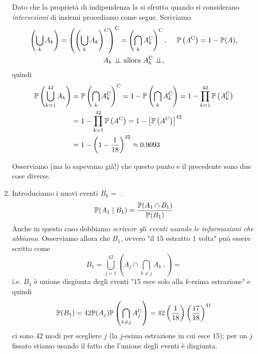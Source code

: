 \begin{enumerate}
	Dato che la proprietà di indipendenza la si sfrutta quando si considerano \textit{intersezioni} di insiemi procediamo come segue. Scriviamo
	\begin{gather*}
		\left(\bigcup_{k} A_{k}\right) =\left(\left(\bigcup_{k} A_{k}\right)^{\mathrm{C}}\right)^{\mathrm{C}} =\left(\bigcap_{k} A_{k}^{\mathrm{C}}\right)^{\mathrm{C}} ,\ \ \ \ \mathbb{P}\left(A^{\mathrm{C}}\right) =1-\mathbb{P}(A) ,\\
		A_{k} \perp \!\!\! \perp \text{allora} \ A_{k}^{\mathrm{C}} \perp \!\!\! \perp ,
	\end{gather*}
	quindi
	\begin{align*}
		\mathbb{P}\left(\bigcup_{k=1}^{42} A_{k}\right) & =\mathbb{P}\left(\bigcap_{k} A_{k}^{\mathrm{C}}\right)^{\mathrm{C}} =1-\mathbb{P}\left(\bigcap_{k} A_{k}^{\mathrm{C}}\right) =1-\prod_{k=1}^{42}\mathbb{P}\left(A_{k}^{\mathrm{C}}\right)\\
		 & =1-\prod_{k=1}^{42}\mathbb{P}\left(A^{\mathrm{C}}\right) =1-\left[\mathbb{P}\left(A^{\mathrm{C}}\right)\right]^{42}\\
		 & =1-\left(1-\frac{1}{18}\right)^{42} \approx 0.9093
	\end{align*}

	\begin{oss}
		Osserviamo (ma lo sapevamo già!) che questo punto e il precedente sono due cose diverse.
	\end{oss}
	\item Introduciamo i nuovi eventi $B_{k} =$ .
	\begin{equation*}
		\mathbb{P}(A_{1} \mid B_{1}) =\frac{\mathbb{P}(A_{1} \cap B_{1})}{\mathbb{P}(B_{1})}
	\end{equation*}
	Anche in questo caso dobbiamo \textit{scrivere gli eventi usando le informazioni che abbiamo}. Osserviamo allora che $B_{1}$, ovvero "il $15$ estratto $1$ volta" può essere scritto come
	\begin{equation*}
		B_{1} =\bigcup_{j=1}^{42}\left(A_{j} \cap \bigcap_{k\neq j} A_{k}\comp\right) =
	\end{equation*}
	i.e. $B_{1}$ è unione disgiunta degli eventi "$15$ esce solo alla $k$-esima estrazione" e quindi
	\begin{equation*}
		\mathbb{P}(B_{1}) =42\mathbb{P}(A_{j})\mathbb{P}\left(\bigcap_{k\neq j} A_{j}^{\mathrm{C}}\right) =42\left(\frac{1}{18}\right)\left(\frac{17}{18}\right)^{41}
	\end{equation*}
	ci sono $42$ modi per scegliere $j$ (la $j$-esima estrazione in cui esce $15$); per un $j$ fissato stiamo usando il fatto che l'unione degli eventi è disgiunta.


\end{enumerate}
